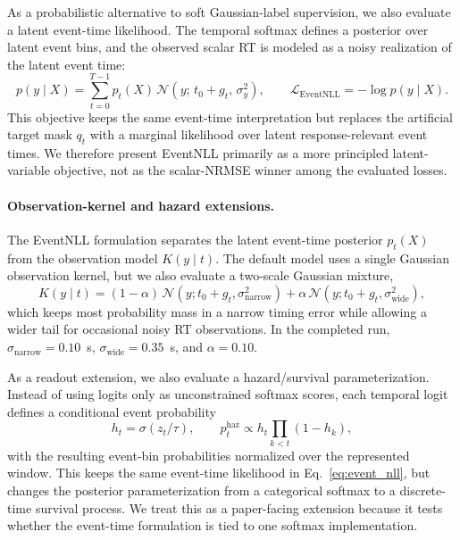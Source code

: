 \documentclass[12pt]{article}
\begin{document}
As a probabilistic alternative to soft Gaussian-label supervision, we also evaluate a latent event-time likelihood. The temporal softmax defines a posterior over latent event bins, and the observed scalar RT is modeled as a noisy realization of the latent event time:
\begin{equation}
\label{eq:event_nll}
p(y\mid X)
= \sum_{t=0}^{T-1} p_t(X)\,
\mathcal{N}\!\left(y;\,t_0 + g_t,\,\sigma_y^2\right),
\qquad
\mathcal{L}_{\mathrm{EventNLL}} = -\log p(y\mid X).
\end{equation}
This objective keeps the same event-time interpretation but replaces the artificial target mask $q_t$ with a marginal likelihood over latent response-relevant event times. We therefore present EventNLL primarily as a more principled latent-variable objective, not as the scalar-NRMSE winner among the evaluated losses.

\paragraph{Observation-kernel and hazard extensions.}
The EventNLL formulation separates the latent event-time posterior $p_t(X)$ from the observation model $K(y\mid t)$. The default model uses a single Gaussian observation kernel, but we also evaluate a two-scale Gaussian mixture,
\begin{equation}
\label{eq:event_nll_mixture_kernel}
K(y\mid t)=(1-\alpha)\,\mathcal{N}(y;t_0+g_t,\sigma_{\mathrm{narrow}}^2)
+\alpha\,\mathcal{N}(y;t_0+g_t,\sigma_{\mathrm{wide}}^2),
\end{equation}
which keeps most probability mass in a narrow timing error while allowing a wider tail for occasional noisy RT observations. In the completed run, $\sigma_{\mathrm{narrow}}=0.10$~s, $\sigma_{\mathrm{wide}}=0.35$~s, and $\alpha=0.10$.

As a readout extension, we also evaluate a hazard/survival parameterization. Instead of using logits only as unconstrained softmax scores, each temporal logit defines a conditional event probability
\begin{equation}
\label{eq:hazard_readout}
h_t=\sigma(z_t/\tau),\qquad
p_t^{\mathrm{haz}} \propto h_t\prod_{k<t}(1-h_k),
\end{equation}
with the resulting event-bin probabilities normalized over the represented window. This keeps the same event-time likelihood in Eq.~\ref{eq:event_nll}, but changes the posterior parameterization from a categorical softmax to a discrete-time survival process. We treat this as a paper-facing extension because it tests whether the event-time formulation is tied to one softmax implementation.
\end{document}
